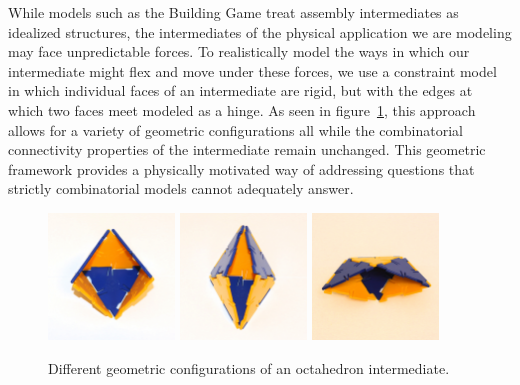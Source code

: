 
While models such as the Building Game treat assembly intermediates as idealized structures, the intermediates of the physical application we are modeling may face unpredictable forces. To realistically model the ways in which our intermediate might flex and move under these forces, we use a constraint model in which individual faces of an intermediate are rigid, but with the edges at which two faces meet modeled as a hinge. As seen in figure~\ref{fig:OctaGCS}, this approach allows for a variety of geometric configurations all while the combinatorial connectivity properties of the intermediate remain unchanged.  This geometric framework provides a physically motivated way of addressing questions that strictly combinatorial models cannot adequately answer. 


\begin{figure}[ht]
       \centering
                \includegraphics[width=0.3\textwidth]{images/OctaGCS_0.eps}
                \includegraphics[width=0.3\textwidth]{images/OctaGCS_1.eps}
                \includegraphics[width=0.3\textwidth]{images/OctaGCS_2.eps}

\caption{Different geometric configurations of an octahedron intermediate.}
\label{fig:OctaGCS}
\end{figure}



